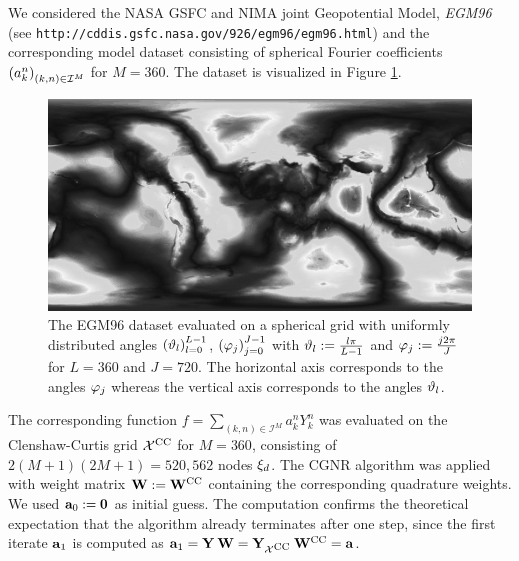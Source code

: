   \begin{example}
    We considered the NASA GSFC and NIMA joint Geopotential Model, \emph{EGM96} (see 
    \verb+http://cddis.gsfc.nasa.gov/926/egm96/egm96.html+) and the corresponding model 
    dataset consisting of spherical Fourier coefficients $\left(a_{k}^n\right)_{(k,n) \in \mathcal{I}^M}$
    for $M = 360$. The dataset is visualized in Figure \ref{Applications:egm96}.

		\begin{figure}[tb]
		  \centering
		  \includegraphics[width=\textwidth]{images/it_orig}
		  \caption{The EGM96 dataset evaluated on a spherical grid with uniformly distributed angles 
      $\left(\vartheta_{l}\right)_{l=0}^{L-1}$, $\left(\varphi_{j}\right)_{j=0}^{J-1}$ with $\vartheta_{l} := \frac{l\pi}{L-1}$
      and $\varphi_{j} := \frac{j 2\pi}{J}$ for $L = 360$ and $J = 720$. The horizontal axis 
      corresponds to the angles $\varphi_{j}$ whereas the vertical axis corresponds to the angles $\vartheta_{l}$.}
		  \label{Applications:egm96}
		\end{figure}    

    The corresponding function $f = \sum_{(k,n) \in \mathcal{I}^M} a_{k}^n Y_{k}^n$ was 
    evaluated on the Clenshaw-Curtis grid 
    $\mathcal{X}^{\mbox{\scriptsize\rm{CC}}}$ for $M = 360$, consisting of $2(M+1)(2M+1) = 520,562$
    nodes $\mathbf{\xi}_{d}$. The CGNR algorithm was 
    applied with weight matrix $\mathbf{W} := \mathbf{W}^{\mbox{\scriptsize\rm{CC}}}$ containing the corresponding 
    quadrature weights. We used $\mathbf{a}_{0} := \mathbf{0}$ as initial guess. 
    The computation confirms the theoretical expectation that the algorithm already 
    terminates after one step, since the first iterate $\mathbf{a}_{1}$ is computed as 
    $\mathbf{a}_{1} = \mathbf{Y} \: \mathbf{W} = \mathbf{Y}_{\mathcal{X}^{\mbox{\scriptsize\rm{CC}}}} \: \mathbf{W}^{\mbox{\scriptsize\rm{CC}}} = \mathbf{a}$.
    

\end{example}
